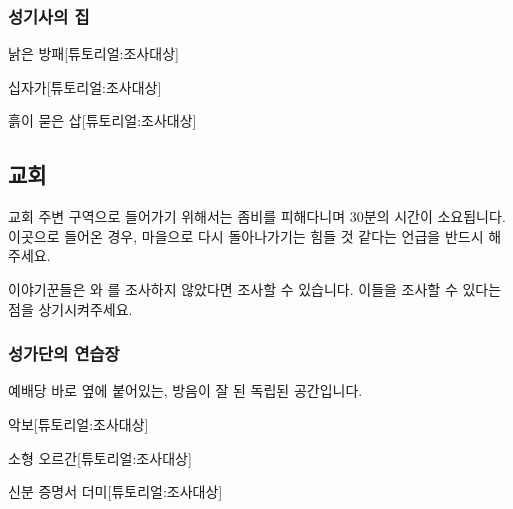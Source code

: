\documentclass{report}
\begin{document}
				\hypertarget{search:paladin}{}
				\subsubsection*{성기사의 집}
					
					\begin{spoiler}{낡은 방패}{[튜토리얼:조사대상]}
					\end{spoiler}
					
					\begin{spoiler}{십자가}{[튜토리얼:조사대상]}
					\end{spoiler}
					
					\begin{spoiler}{흙이 묻은 삽}{[튜토리얼:조사대상]}
					\end{spoiler}
				
			\subsection{교회}
				교회 주변 구역으로 들어가기 위해서는 좀비를 피해다니며 30분의 시간이 소요됩니다. 이곳으로 들어온 경우, 마을으로 다시 돌아나가기는 힘들 것 같다는 언급을 반드시 해주세요.
				
				이야기꾼들은 와 를 조사하지 않았다면 조사할 수 있습니다. 이들을 조사할 수 있다는 점을 상기시켜주세요.
				
				\hypertarget{search:choir-practice}{}
				\subsubsection*{성가단의 연습장}
					예배당 바로 옆에 붙어있는, 방음이 잘 된 독립된 공간입니다.
					
					\begin{spoiler}{악보}{[튜토리얼:조사대상]}
					\end{spoiler}
					
					\begin{spoiler}{소형 오르간}{[튜토리얼:조사대상]}
					\end{spoiler}
					
					\begin{spoiler}{신분 증명서 더미}{[튜토리얼:조사대상]}
					\end{spoiler}
				
\end{document}
